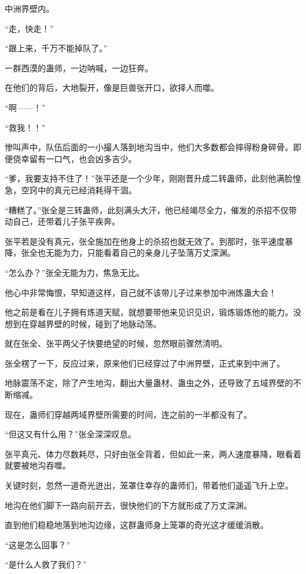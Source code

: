 
\begin{this_body}

中洲界壁内。

“走，快走！”

“跟上来，千万不能掉队了。”

一群西漠的蛊师，一边呐喊，一边狂奔。

在他们的背后，大地裂开，像是巨兽张开口，欲择人而噬。

“啊——！”

“救我！！”

惨叫声中，队伍后面的一小撮人落到地沟当中，他们大多数都会摔得粉身碎骨。即便侥幸留有一口气，也会凶多吉少。

“爹，我要支持不住了！”张平还是一个少年，刚刚晋升成二转蛊师，此刻他满脸惶急，空窍中的真元已经消耗得干涸。

“糟糕了。”张全是三转蛊师，此刻满头大汗，他已经竭尽全力，催发的杀招不仅带动自己，还带着儿子张平疾奔。

张平若是没有真元，张全施加在他身上的杀招也就无效了。到那时，张平速度暴降，张全也无能为力，只能看着自己的亲身儿子坠落万丈深渊。

“怎么办？”张全无能为力，焦急无比。

他心中非常悔恨，早知道这样，自己就不该带儿子过来参加中洲炼蛊大会！

他之前是看在儿子拥有炼道天赋，就想要带他来见识见识，锻炼锻炼他的能力。没想到在穿越界壁的时候，碰到了地脉动荡。

就在张全、张平两父子快要绝望的时候，忽然眼前骤然清明。

张全楞了一下，反应过来，原来他们已经穿过了中洲界壁，正式来到中洲了。

地脉震荡不定，除了产生地沟，翻出大量蛊材、蛊虫之外，还导致了五域界壁的不断缩减。

现在，蛊师们穿越两域界壁所需要的时间，连之前的一半都没有了。

“但这又有什么用？”张全深深叹息。

张平真元、体力尽数耗尽，只好由张全背着，但如此一来，两人速度暴降，眼看着就要被地沟吞噬。

关键时刻，忽然一道奇光迸出，笼罩住幸存的蛊师们，带着他们遥遥飞升上空。

地沟在他们脚下一路向前开去，很快他们的下方就形成了万丈深渊。

直到他们稳稳地落到地沟边缘，这群蛊师身上笼罩的奇光这才缓缓消散。

“这是怎么回事？”

“是什么人救了我们？”


\end{this_body}
